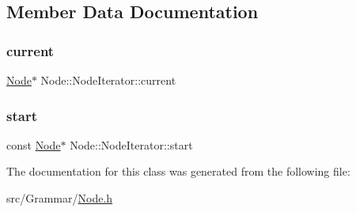 \subsection{Member Data Documentation}
\mbox{\label{class_node_1_1_node_iterator_aef4bbf58890919058172facd8b91238a}} 
\subsubsection{\texorpdfstring{current}{current}}
{\footnotesize\ttfamily \hyperlink{class_node}{Node}$\ast$ Node\+::\+Node\+Iterator\+::current\hspace{0.3cm}{\ttfamily [protected]}}

\mbox{\label{class_node_1_1_node_iterator_a7f1dc14103049a99cd9929946ecbd0f0}} 
\subsubsection{\texorpdfstring{start}{start}}
{\footnotesize\ttfamily const \hyperlink{class_node}{Node}$\ast$ Node\+::\+Node\+Iterator\+::start\hspace{0.3cm}{\ttfamily [protected]}}



The documentation for this class was generated from the following file\+:\begin{DoxyCompactItemize}
\item 
src/\+Grammar/\hyperlink{_node_8h}{Node.\+h}\end{DoxyCompactItemize}
